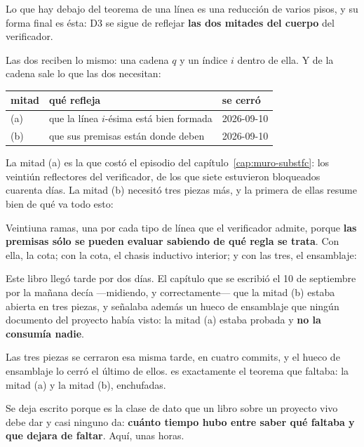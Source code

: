Lo que hay debajo del teorema de una línea es una reducción de varios pisos, y su forma final es
ésta: D3 se sigue de reflejar \textbf{las dos mitades del cuerpo} del verificador.



Las dos reciben lo mismo: una cadena $q$ y un índice $i$ dentro de ella. Y de la cadena sale lo que
las dos necesitan:


\begin{center}\small
\begin{tabularx}{\linewidth}{@{}l >{\raggedright\arraybackslash}X l@{}}
\toprule
mitad & qué refleja & se cerró \\
\midrule
(a) & que la línea $i$-ésima está bien formada & 2026-09-10 \\
(b) & que sus premisas están donde deben & 2026-09-10 \\
\bottomrule
\end{tabularx}
\end{center}

La mitad (a) es la que costó el episodio del capítulo~\ref{cap:muro-substfc}: los veintiún
reflectores del verificador, de los que siete estuvieron bloqueados cuarenta días. La mitad (b)
necesitó tres piezas más, y la primera de ellas resume bien de qué va todo esto:



Veintiuna ramas, una por cada tipo de línea que el verificador admite, porque \textbf{las premisas
sólo se pueden evaluar sabiendo de qué regla se trata}. Con ella, la cota; con la cota, el chasis
inductivo interior; y con las tres, el ensamblaje:


\begin{observacion}
Este libro llegó tarde por dos días. El capítulo que se escribió el 10 de septiembre por la mañana
decía —midiendo, y correctamente— que la mitad (b) estaba abierta en tres piezas, y señalaba además
un hueco de ensamblaje que ningún documento del proyecto había visto: la mitad (a) estaba probada y
\textbf{no la consumía nadie}.

Las tres piezas se cerraron esa misma tarde, en cuatro commits, y el hueco de ensamblaje lo cerró
el último de ellos.  es exactamente el teorema que faltaba: la mitad (a) y la
mitad (b), enchufadas.

Se deja escrito porque es la clase de dato que un libro sobre un proyecto vivo debe dar y casi
ninguno da: \textbf{cuánto tiempo hubo entre saber qué faltaba y que dejara de faltar}. Aquí,
unas horas.
\end{observacion}

